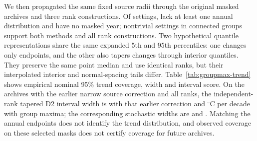 We then propagated the same fixed source radii through the original masked archives and three rank constructions. Of \GMAllArchives{} settings, \GMNoAnnual{} lack at least one annual distribution and \GMNoGap{} have no masked year; \GMTrendCases{} nontrivial settings in \GMTrendGroups{} connected groups support both methods and all rank constructions. Two hypothetical quantile representations share the same expanded 5th and 95th percentiles: one changes only endpoints, and the other also tapers changes through interior quantiles. They preserve the same point median and use identical ranks, but their interpolated interior and normal-spacing tails differ. Table~\ref{tab:groupmax-trend} shows empirical nominal 95\% trend coverage, width and interval score. On the \GMOverlapCases{} archives with the earlier narrow source correction and all ranks, the independent-rank tapered D2 interval width is \GMOverlapDOldWidth{} with that earlier correction and \GMOverlapDNewWidth{} $^{\circ}$C per decade with group maxima; the corresponding stochastic widths are \GMOverlapCOldWidth{} and \GMOverlapCNewWidth{}. Matching the annual endpoints does not identify the trend distribution, and observed coverage on these selected masks does not certify coverage for future archives.

\begin{table}[ht]\caption{Nominal 95\% forward trend intervals on \GMTrendCases{} common nontrivial archives. Each entry is baseline / endpoint-only / tapered; widths and interval scores are $^{\circ}$C per decade.}\label{tab:groupmax-trend}\centering\small
{}\end{table}

